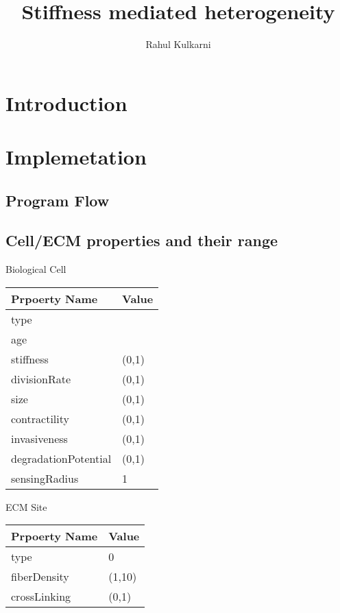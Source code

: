 \documentclass[a4paper,10pt]{article}
\title{Stiffness mediated heterogeneity}
\author{Rahul Kulkarni}
\begin{document}
\maketitle

\begin{abstract}

\end{abstract}

\section{Introduction}
\section{Implemetation}
\subsection{Program Flow}
\subsection{Cell/ECM properties and their range}

Biological Cell

\begin{tabular}{|l|l|}
\hline
Prpoerty Name & Value \\ \hline
type \\ \hline
age \\ \hline
stiffness  & (0,1) \\ \hline
divisionRate  & (0,1) \\ \hline
size  & (0,1) \\ \hline
contractility  & (0,1) \\ \hline
invasiveness  & (0,1) \\ \hline
degradationPotential & (0,1) \\ \hline
sensingRadius & 1\\ \hline
\end{tabular}



ECM Site
\begin{tabular}{|l|l|}
\hline
Prpoerty Name & Value \\ \hline
type & 0\\ \hline
fiberDensity  & (1,10)\\ \hline
crossLinking  & (0,1)\\ \hline
\end{tabular}
\end{document}
